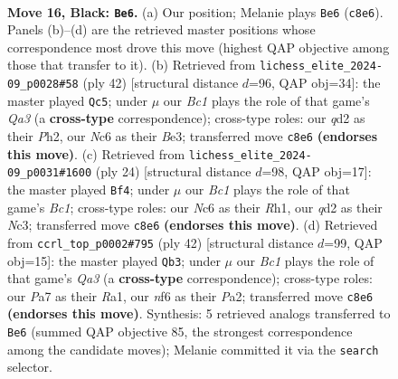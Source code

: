 \documentclass[11pt]{article}
\begin{document}
\clearpage

\begin{figure}[p]\centering
\begin{subfigure}{0.46\textwidth}\centering
\resizebox{\linewidth}{!}{%
\newchessgame
\chessboard[
  setfen={r1bk3r/pp3p1p/2n2N2/4p3/3p4/2qP1N2/P2Q1PPP/5RK1 b - - 1 16},
  showmover=false,
  pgfstyle=straightmove, color=movearrow, markmove={c8-e6}
]}
\caption{}
\end{subfigure}\hfill
\begin{subfigure}{0.46\textwidth}\centering
\resizebox{\linewidth}{!}{%
\newchessgame
\chessboard[
  setfen={5rk1/p1p1ppbp/2n3p1/8/3PN3/Q3B1Pq/R3PP1P/6K1 w - - 0 22},
  showmover=false,
  pgfstyle=straightmove, color=movearrow, markmove={a3-c5}
]}
\caption{}
\end{subfigure}
\\[4pt]
\begin{subfigure}{0.46\textwidth}\centering
\resizebox{\linewidth}{!}{%
\newchessgame
\chessboard[
  setfen={r1b2rk1/p1p2ppp/5n2/4q3/Q1p5/2N3P1/PP2PP1P/R1B1K2R w KQ - 0 13},
  showmover=false,
  pgfstyle=straightmove, color=movearrow, markmove={c1-f4}
]}
\caption{}
\end{subfigure}\hfill
\begin{subfigure}{0.46\textwidth}\centering
\resizebox{\linewidth}{!}{%
\newchessgame
\chessboard[
  setfen={2r2rk1/pp1q2pp/4p3/4Pn2/2Pp3P/Q4N2/P2R1PP1/R5K1 w - - 2 22},
  showmover=false,
  pgfstyle=straightmove, color=movearrow, markmove={a3-b3}
]}
\caption{}
\end{subfigure}
\caption{\textbf{Move 16, Black: \texttt{Be6}.} (a) Our position; Melanie plays \texttt{Be6} (\texttt{c8e6}). Panels (b)--(d) are the retrieved master positions whose correspondence most drove this move (highest QAP objective among those that transfer to it). (b) Retrieved from \texttt{lichess\_elite\_2024-09\_p0028\#58} (ply 42) [structural distance $d$=96, QAP obj=34]: the master played \texttt{Qc5}; under $\mu$ our \emph{Bc1} plays the role of that game's \emph{Qa3} (a \textbf{cross-type} correspondence); cross-type roles: our \emph{q}d2 as their \emph{P}h2, our \emph{N}c6 as their \emph{B}e3; transferred move \texttt{c8e6} \textbf{(endorses this move)}. (c) Retrieved from \texttt{lichess\_elite\_2024-09\_p0031\#1600} (ply 24) [structural distance $d$=98, QAP obj=17]: the master played \texttt{Bf4}; under $\mu$ our \emph{Bc1} plays the role of that game's \emph{Bc1}; cross-type roles: our \emph{N}c6 as their \emph{R}h1, our \emph{q}d2 as their \emph{N}c3; transferred move \texttt{c8e6} \textbf{(endorses this move)}. (d) Retrieved from \texttt{ccrl\_top\_p0002\#795} (ply 42) [structural distance $d$=99, QAP obj=15]: the master played \texttt{Qb3}; under $\mu$ our \emph{Bc1} plays the role of that game's \emph{Qa3} (a \textbf{cross-type} correspondence); cross-type roles: our \emph{P}a7 as their \emph{R}a1, our \emph{n}f6 as their \emph{P}a2; transferred move \texttt{c8e6} \textbf{(endorses this move)}. Synthesis: 5 retrieved analogs transferred to \texttt{Be6} (summed QAP objective 85, the strongest correspondence among the candidate moves); Melanie committed it via the \texttt{search} selector.}
\label{fig:thought-m31}
\end{figure}
\end{document}
